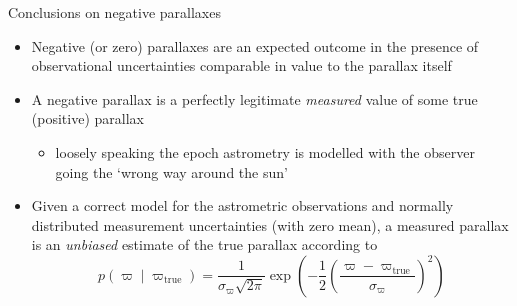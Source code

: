 \documentclass[smaller, aspectratio=169]{beamer}
\begin{document}
\begin{agaframe}{Conclusions on negative parallaxes}
  \begin{itemize}
    \item Negative (or zero) parallaxes are an expected outcome in the presence of observational uncertainties
      comparable in value to the parallax itself
    \item A negative parallax is a perfectly legitimate {\em measured} value of some true (positive)
      parallax
      \begin{itemize}
        \item loosely speaking the epoch astrometry is modelled with the observer going the `wrong
          way around the sun'
      \end{itemize}
    \item Given a correct model for the astrometric observations and normally distributed
      measurement uncertainties (with zero mean), a measured parallax is an {\em unbiased} estimate of the
      true parallax according to
      \begin{equation*}
        p(\varpi\mid\varpi_\mathrm{true}) = \frac{1}{\sigma_\varpi\sqrt{2\pi}} \exp\left(
        -\frac{1}{2}\left(\frac{\varpi-\varpi_\mathrm{true}}{\sigma_\varpi}\right)^2\right)
      \end{equation*}
  \end{itemize}
\end{agaframe}
%
\end{document}
